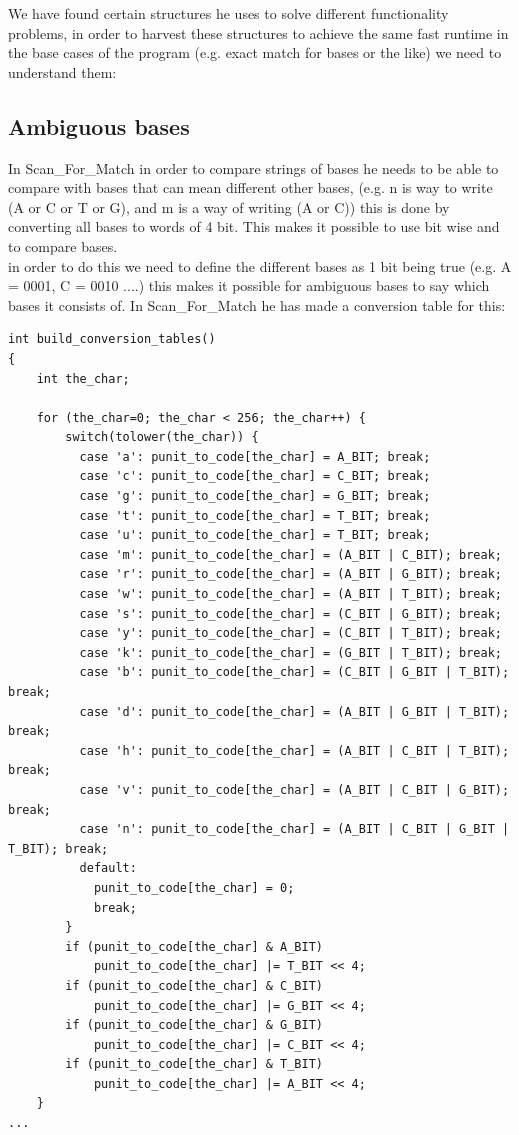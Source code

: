 \documentclass[12pt]{article}
\begin{document}
We have found certain structures he uses to solve different functionality problems, in order to harvest these structures to achieve the same fast runtime in the base cases of the program (e.g. exact match for bases or the like) we need to understand them:

\subsection{Ambiguous bases}
In Scan\_For\_Match in order to compare strings of bases he needs to be able to compare with bases that can mean different other bases, (e.g. n is way to write (A or C or T or G), and m is a way of writing (A or C)) this is done by converting all bases to words of 4 bit. This makes it possible to use bit wise and to compare bases. \\
in order to do this we need to define the different bases as 1 bit being true (e.g. A = 0001, C = 0010 ....) this makes it possible for ambiguous bases to say which bases it consists of. In Scan\_For\_Match he has made a conversion table for this:
\begin{lstlisting}
int build_conversion_tables()
{
    int the_char;

    for (the_char=0; the_char < 256; the_char++) {
        switch(tolower(the_char)) {
          case 'a': punit_to_code[the_char] = A_BIT; break;
          case 'c': punit_to_code[the_char] = C_BIT; break;
          case 'g': punit_to_code[the_char] = G_BIT; break;
          case 't': punit_to_code[the_char] = T_BIT; break;
          case 'u': punit_to_code[the_char] = T_BIT; break;
          case 'm': punit_to_code[the_char] = (A_BIT | C_BIT); break;
          case 'r': punit_to_code[the_char] = (A_BIT | G_BIT); break;
          case 'w': punit_to_code[the_char] = (A_BIT | T_BIT); break;
          case 's': punit_to_code[the_char] = (C_BIT | G_BIT); break;
          case 'y': punit_to_code[the_char] = (C_BIT | T_BIT); break;
          case 'k': punit_to_code[the_char] = (G_BIT | T_BIT); break;
          case 'b': punit_to_code[the_char] = (C_BIT | G_BIT | T_BIT); break;
          case 'd': punit_to_code[the_char] = (A_BIT | G_BIT | T_BIT); break;
          case 'h': punit_to_code[the_char] = (A_BIT | C_BIT | T_BIT); break;
          case 'v': punit_to_code[the_char] = (A_BIT | C_BIT | G_BIT); break;
          case 'n': punit_to_code[the_char] = (A_BIT | C_BIT | G_BIT | T_BIT); break;
          default:
            punit_to_code[the_char] = 0;
            break;
        }
        if (punit_to_code[the_char] & A_BIT)
            punit_to_code[the_char] |= T_BIT << 4;
        if (punit_to_code[the_char] & C_BIT)
            punit_to_code[the_char] |= G_BIT << 4;
        if (punit_to_code[the_char] & G_BIT)
            punit_to_code[the_char] |= C_BIT << 4;
        if (punit_to_code[the_char] & T_BIT)
            punit_to_code[the_char] |= A_BIT << 4;
    }
...
\end{lstlisting}
\end{document}
